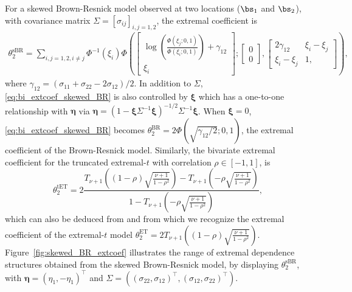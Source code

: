 \documentclass[12pt]{article}
\begin{document}
%
For a skewed Brown-Resnick model observed at two locations ($\bs_1$ and $\bs_2$), with covariance matrix $\Sigma = \left[ \sigma_{ij}\right]_{i,j=1,2}$, the extremal coefficient is 
%
\begin{align}
\label{eq:bi_extcoef_skewed_BR}
\theta_{2}^{\textrm{sBR}} = \sum_{i,j=1,2,i\neq j}\Phi^{-1}(\xi_i)
\Phi\left(
\begin{bmatrix} 
\log\left(\frac{\Phi(\xi_j;0,1)}{\Phi(\xi_i;0,1)}\right) + \gamma_{12} \\ 
\xi_i 
\end{bmatrix};
\begin{bmatrix}
0 \\ 0
\end{bmatrix},
\begin{bmatrix}
2\gamma_{12} & \xi_i - \xi_j \\ \xi_i - \xi_j & 1,
\end{bmatrix}\right), 
\end{align}
%
where $\gamma_{12} = (\sigma_{11} + \sigma_{22} -2\sigma_{12})/2$. In addition to $\Sigma$, \eqref{eq:bi_extcoef_skewed_BR} is also controlled by $\bm\xi$ which has a one-to-one relationship with $\bm\eta$ via $\bm\eta = (1-\bm \xi \Sigma^{-1} \bm\xi)^{-1/2}\Sigma^{-1}\bm\xi$.
When $\bm \xi = 0$, \eqref{eq:bi_extcoef_skewed_BR} becomes $\theta_{2}^{\textrm{BR}} = 2 \Phi(\sqrt{\gamma_{12}/2}; 0, 1)$, the extremal coefficient of the Brown-Resnick model.
Similarly, the bivariate extremal coefficient for the truncated extremal-$t$ with correlation $\rho \in [-1,1]$, is
%
\begin{equation}
\label{eq:bi_extcoef_trunc_ET}  
\theta_2^{\textrm{tET}} = 2 \frac{T_{\nu+1}\left( (1-\rho) \sqrt{\frac{\nu+1}{1-\rho^2}} \right) - T_{\nu+1}\left( -\rho \sqrt{\frac{\nu+1}{1-\rho^2}} \right)}{1-T_{\nu+1}\left( -\rho \sqrt{\frac{\nu+1}{1-\rho^2}} \right)}, 
\end{equation}
%
which can also be deduced from \citet{Beranger.Podoan.Sisson:2021} and from which we recognize the extremal coefficient of the extremal-$t$ model $\theta_2^{\textrm{ET}} = 2 T_{\nu+1}\left( (1-\rho) \sqrt{\frac{\nu+1}{1-\rho^2}} \right)$. 
%
Figure~\ref{fig:skewed_BR_extcoef} illustrates the range of extremal dependence structures obtained from the skewed Brown-Resnick model, by displaying $\theta_2^{\textrm{sBR}}$, with $\bm\eta = (\eta_1,-\eta_1)^\top$ and $\Sigma = ((\sigma_{22},\sigma_{12})^\top,(\sigma_{12},\sigma_{22})^\top)$. 
\end{document}
